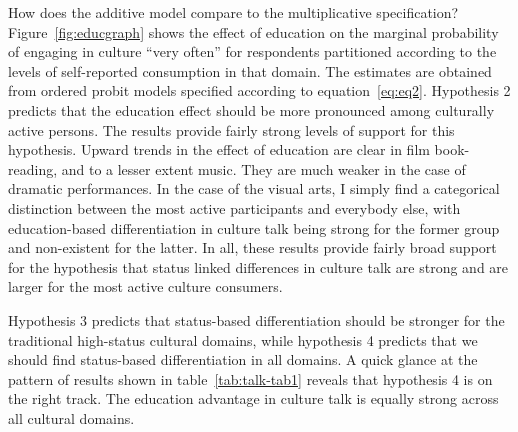 How does the additive model compare to the multiplicative specification?  Figure~\ref{fig:educgraph} shows the effect of education on the marginal probability of engaging in culture ``very often'' for respondents partitioned according to the levels of self-reported consumption in that domain.  The estimates are obtained from ordered probit models specified according to equation~\ref{eq:eq2}. Hypothesis 2 predicts that the education effect should be more pronounced among culturally active persons.  The results provide fairly strong levels of support for this hypothesis. Upward trends in the effect of education are clear in film book-reading, and to a lesser extent music.  They are much weaker in the case of dramatic performances. In the case of the visual arts, I simply find a categorical distinction between the most active participants and everybody else, with education-based differentiation in culture talk being strong for the former group and non-existent for the latter.  In all, these results provide fairly broad support for the hypothesis that status linked differences in culture talk are strong and are larger for the most active culture consumers.

Hypothesis 3 predicts that status-based differentiation should be stronger for the traditional high-status cultural domains, while hypothesis 4 predicts that we should find status-based differentiation in all domains.  A quick glance at the pattern of results shown in table~\ref{tab:talk-tab1} reveals that hypothesis 4 is on the right track.  The education advantage in culture talk is equally strong across all cultural domains.


  


